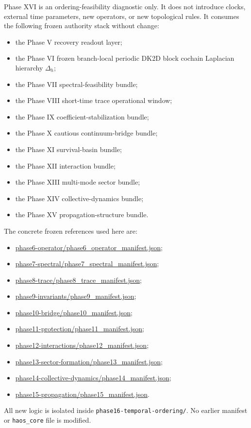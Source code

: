 \documentclass[11pt]{article}
\begin{document}
Phase XVI is an ordering-feasibility diagnostic only. It does not introduce clocks, external time parameters, new operators, or new topological rules. It consumes the following frozen authority stack without change:
\begin{itemize}
\item the Phase V recovery readout layer;
\item the Phase VI frozen branch-local periodic DK2D block cochain Laplacian hierarchy $\Delta_h$;
\item the Phase VII spectral-feasibility bundle;
\item the Phase VIII short-time trace operational window;
\item the Phase IX coefficient-stabilization bundle;
\item the Phase X cautious continuum-bridge bundle;
\item the Phase XI survival-basin bundle;
\item the Phase XII interaction bundle;
\item the Phase XIII multi-mode sector bundle;
\item the Phase XIV collective-dynamics bundle;
\item the Phase XV propagation-structure bundle.
\end{itemize}

The concrete frozen references used here are:
\begin{itemize}
\item \url{phase6-operator/phase6_operator_manifest.json};
\item \url{phase7-spectral/phase7_spectral_manifest.json};
\item \url{phase8-trace/phase8_trace_manifest.json};
\item \url{phase9-invariants/phase9_manifest.json};
\item \url{phase10-bridge/phase10_manifest.json};
\item \url{phase11-protection/phase11_manifest.json};
\item \url{phase12-interactions/phase12_manifest.json};
\item \url{phase13-sector-formation/phase13_manifest.json};
\item \url{phase14-collective-dynamics/phase14_manifest.json};
\item \url{phase15-propagation/phase15_manifest.json}.
\end{itemize}

All new logic is isolated inside \texttt{phase16-temporal-ordering/}. No earlier manifest or \texttt{haos\_core} file is modified.
\end{document}
